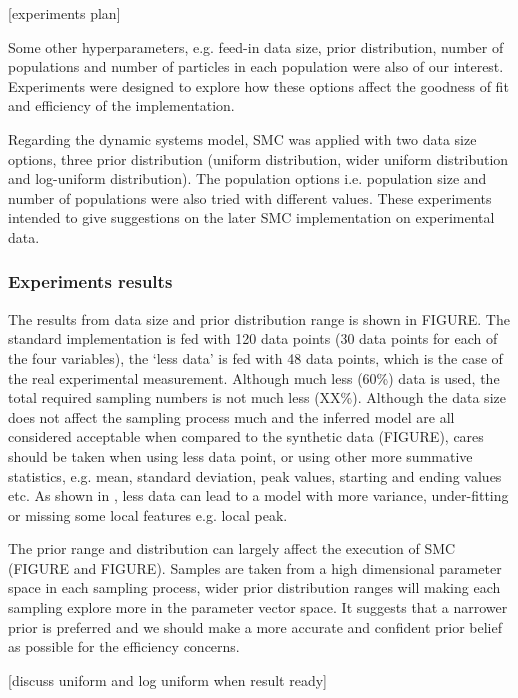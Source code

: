 \documentclass[12pt,a4paper]{report}
\begin{document}
[experiments plan]

Some other hyperparameters, e.g. feed-in data size, prior distribution, number of populations and number of particles in each population were also of our interest. Experiments were designed to explore how these options affect the goodness of fit and efficiency of the implementation.

Regarding the dynamic systems model, SMC was applied with two data size options, three prior distribution (uniform distribution, wider uniform distribution and log-uniform distribution). The population options i.e. population size and number of populations were also tried with different values. These experiments intended to give suggestions on the later SMC implementation on experimental data.

\subsubsection{Experiments results}

The results from data size and prior distribution range is shown in FIGURE. The standard implementation is fed with 120 data points (30 data points for each of the four variables), the `less data' is fed with 48 data points, which is the case of the real experimental measurement. Although much less (60\%) data is used, the total required sampling numbers is not much less (XX\%). Although the data size does not affect the sampling process much and the inferred model are all considered acceptable when compared to the synthetic data (FIGURE), cares should be taken when using less data point, or using other more summative statistics, e.g. mean, standard deviation, peak values, starting and ending values etc. As shown in \cite{ref:disease}, less data can lead to a model with more variance, under-fitting or missing some local features e.g. local peak.

The prior range and distribution can largely affect the execution of SMC (FIGURE and FIGURE). Samples are taken from a high dimensional parameter space in each sampling process, wider prior distribution ranges will making each sampling explore more in the parameter vector space. It suggests that a narrower prior is preferred and we should make a more accurate and confident prior belief as possible for the efficiency concerns.

    [discuss uniform and log uniform when result ready]
\end{document}

